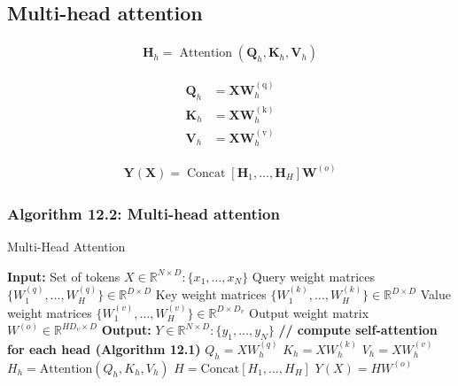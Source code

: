 \documentclass{article}
\begin{document}
\subsection{Multi-head attention}
\begin{align*}
\mathbf{H}_{h}=\operatorname{Attention}\left(\mathbf{Q}_{h}, \mathbf{K}_{h}, \mathbf{V}_{h}\right) \tag{12.15}
\end{align*}

\begin{align*}
\mathbf{Q}_{h} & =\mathbf{X} \mathbf{W}_{h}^{(\mathrm{q})}  \tag{12.16}\\
\mathbf{K}_{h} & =\mathbf{X} \mathbf{W}_{h}^{(\mathrm{k})}  \tag{12.17}\\
\mathbf{V}_{h} & =\mathbf{X} \mathbf{W}_{h}^{(\mathrm{v})} \tag{12.18}
\end{align*}

\begin{align*}
\mathbf{Y}(\mathbf{X})=\operatorname{Concat}\left[
\mathbf{H}_{1}, \ldots, \mathbf{H}_{H}\right]
\mathbf{W}^{(o)} \tag{12.19}
\end{align*}

\subsubsection{Algorithm 12.2: Multi-head attention}

\begin{algorithm}[H]
\caption{Multi-Head Attention}
\begin{algorithmic}[1]
\STATE \textbf{Input:} Set of tokens $X \in \mathbb{R}^{N \times D} : \{x_1, \ldots, x_N\}$
\STATE \quad Query weight matrices $\{W^{(q)}_1, \ldots, W^{(q)}_H\} \in \mathbb{R}^{D \times D}$
\STATE \quad Key weight matrices $\{W^{(k)}_1, \ldots, W^{(k)}_H\} \in \mathbb{R}^{D \times D}$
\STATE \quad Value weight matrices $\{W^{(v)}_1, \ldots, W^{(v)}_H\} \in \mathbb{R}^{D \times D_v}$
\STATE \quad Output weight matrix $W^{(o)} \in \mathbb{R}^{H D_v \times D}$
\STATE \textbf{Output:} $Y \in \mathbb{R}^{N \times D} : \{y_1, \ldots, y_N\}$
\STATE \textbf{// compute self-attention for each head (Algorithm 12.1)}
    \STATE $Q_h = X W^{(q)}_h$
    \STATE $K_h = X W^{(k)}_h$
    \STATE $V_h = X W^{(v)}_h$
    \STATE $H_h = \text{Attention}(Q_h, K_h, V_h)$ 
\ENDFOR
\STATE $H = \text{Concat}[H_1, \ldots, H_H]$ 
\RETURN $Y(X) = H W^{(o)}$
\end{algorithmic}
\end{algorithm}
\end{document}
